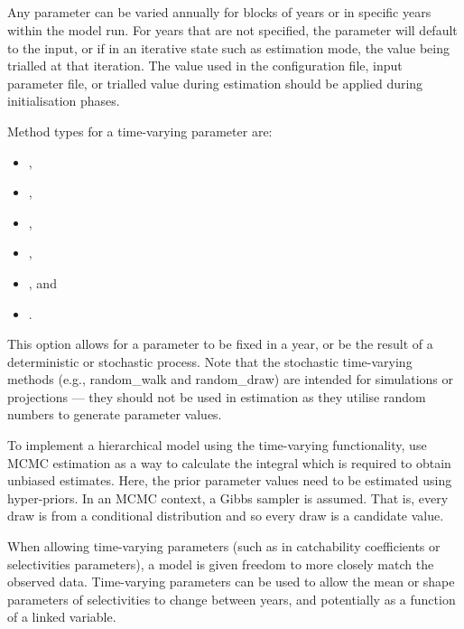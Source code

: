 \subsection{} \label{sec:TimeVarying}

Any parameter can be varied annually for blocks of years or in specific years within the model run. For years that are not specified, the parameter will default to the input, or if in an iterative state such as estimation mode, the value being trialled at that iteration. The value used in the configuration file, input parameter file, or trialled value during estimation should be applied during initialisation phases.

Method types for a time-varying parameter are:

\begin{itemize}
	\item {},
	\item {},
	\item {},
	\item {},
	\item {}, and
	\item {}.
\end{itemize}

This option allows for a parameter to be fixed in a year, or be the result of a deterministic or stochastic process. Note that the stochastic time-varying methods (e.g., random\_walk and random\_draw) are intended for simulations or projections --- they should not be used in estimation as they utilise random numbers to generate parameter values. 

To implement a hierarchical model using the time-varying functionality, use MCMC estimation as a way to calculate the integral which is required to obtain unbiased estimates. Here, the prior parameter values need to be estimated using hyper-priors. In an MCMC context, a Gibbs sampler is assumed. That is, every draw is from a conditional distribution and so every draw is a candidate value.

When allowing time-varying parameters (such as in catchability coefficients or selectivities parameters), a model is given freedom to more closely match the observed data. Time-varying parameters can be used to allow the mean or shape parameters of selectivities to change between years, and potentially as a function of a linked variable.


